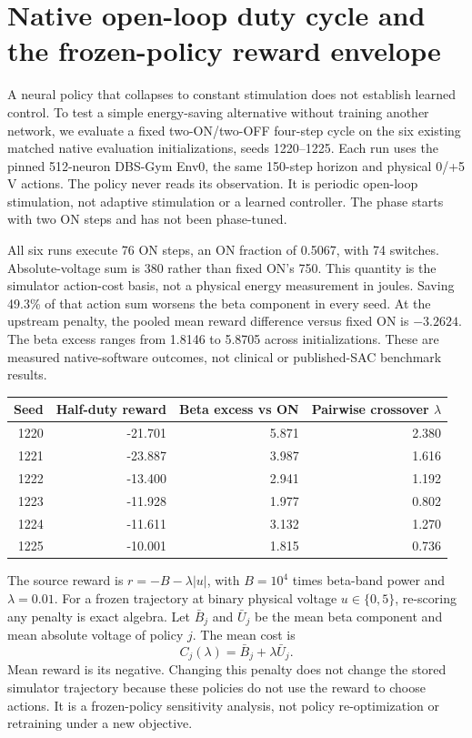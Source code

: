\section{Native open-loop duty cycle and the frozen-policy reward envelope}

A neural policy that collapses to constant stimulation does not establish learned control. To test a simple energy-saving alternative without training another network, we evaluate a fixed two-ON/two-OFF four-step cycle on the six existing matched native evaluation initializations, seeds 1220--1225. Each run uses the pinned 512-neuron DBS-Gym Env0, the same 150-step horizon and physical 0/+5 V actions. The policy never reads its observation. It is periodic open-loop stimulation, not adaptive stimulation or a learned controller. The phase starts with two ON steps and has not been phase-tuned.

All six runs execute 76 ON steps, an ON fraction of 0.5067, with 74 switches. Absolute-voltage sum is 380 rather than fixed ON's 750. This quantity is the simulator action-cost basis, not a physical energy measurement in joules. Saving 49.3\% of that action sum worsens the beta component in every seed. At the upstream penalty, the pooled mean reward difference versus fixed ON is $-3.2624$. The beta excess ranges from 1.8146 to 5.8705 across initializations. These are measured native-software outcomes, not clinical or published-SAC benchmark results.

\begin{center}\begin{tabular}{rrrr}\hline
Seed & Half-duty reward & Beta excess vs ON & Pairwise crossover $\lambda$\\\hline
1220 & -21.701 & 5.871 & 2.380\\
1221 & -23.887 & 3.987 & 1.616\\
1222 & -13.400 & 2.941 & 1.192\\
1223 & -11.928 & 1.977 & 0.802\\
1224 & -11.611 & 3.132 & 1.270\\
1225 & -10.001 & 1.815 & 0.736\\\hline
\end{tabular}\end{center}

The source reward is $r=-B-\lambda|u|$, with $B=10^4$ times beta-band power and $\lambda=0.01$. For a frozen trajectory at binary physical voltage $u\in\{0,5\}$, re-scoring any penalty is exact algebra. Let $\bar B_j$ and $\bar U_j$ be the mean beta component and mean absolute voltage of policy $j$. The mean cost is
\[
C_j(\lambda)=\bar B_j+\lambda\bar U_j.
\]
Mean reward is its negative. Changing this penalty does not change the stored simulator trajectory because these policies do not use the reward to choose actions. It is a frozen-policy sensitivity analysis, not policy re-optimization or retraining under a new objective.

